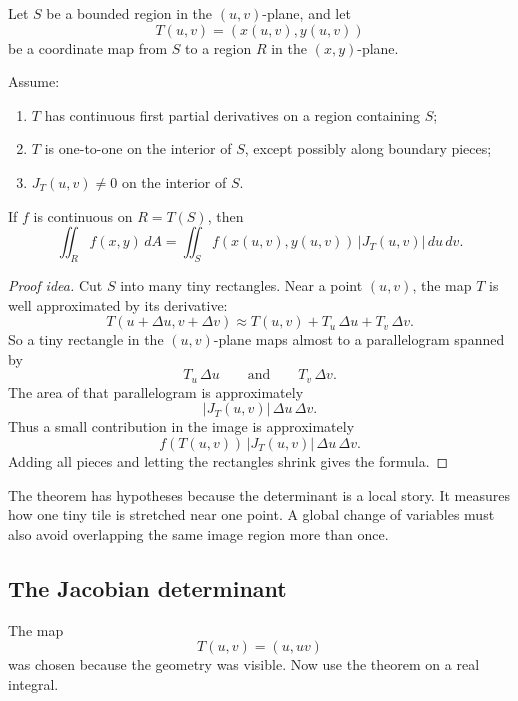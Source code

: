 \begin{theorem}
Let \(S\) be a bounded region in the \((u,v)\)-plane, and let
\[
    T(u,v)=(x(u,v),y(u,v))
\]
be a coordinate map from \(S\) to a region \(R\) in the \((x,y)\)-plane.

Assume:

\begin{enumerate}
\item \(T\) has continuous first partial derivatives on a region containing \(S\);

\item \(T\) is one-to-one on the interior of \(S\), except possibly along boundary
pieces;

\item \(J_T(u,v)\ne0\) on the interior of \(S\).
\end{enumerate}

If \(f\) is continuous on \(R=T(S)\), then
\[
\boxed{
    \iint_R f(x,y)\,dA
    =
    \iint_S f(x(u,v),y(u,v))\,|J_T(u,v)|\,du\,dv.
}
\]
\end{theorem}

\begin{proof}[Proof idea]
Cut \(S\) into many tiny rectangles.  Near a point \((u,v)\), the map \(T\) is well
approximated by its derivative:
\[
    T(u+\Delta u,v+\Delta v)
    \approx
    T(u,v)+T_u\,\Delta u+T_v\,\Delta v.
\]
So a tiny rectangle in the \((u,v)\)-plane maps almost to a parallelogram spanned by
\[
    T_u\,\Delta u
    \qquad\text{and}\qquad
    T_v\,\Delta v.
\]
The area of that parallelogram is approximately
\[
    |J_T(u,v)|\,\Delta u\,\Delta v.
\]
Thus a small contribution in the image is approximately
\[
    f(T(u,v))\,|J_T(u,v)|\,\Delta u\,\Delta v.
\]
Adding all pieces and letting the rectangles shrink gives the formula.
\end{proof}

The theorem has hypotheses because the determinant is a local story.  It measures how
one tiny tile is stretched near one point.  A global change of variables must also avoid
overlapping the same image region more than once.

\subsection{The Jacobian determinant}

The map
\[
    T(u,v)=(u,uv)
\]
was chosen because the geometry was visible.  Now use the theorem on a real integral.

